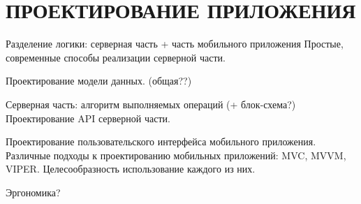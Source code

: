\section[Проектирование приложения]{%
  ПРОЕКТИРОВАНИЕ ПРИЛОЖЕНИЯ
}

\label{sec:design}

Разделение логики: серверная часть + часть мобильного приложения
Простые, современные способы реализации серверной части.

Проектирование модели данных. (общая??)

Серверная часть: алгоритм выполняемых операций (+ блок-схема?)
Проектирование API серверной части.

Проектирование пользовательского интерфейса мобильного приложения.
Различные подходы к проектированию мобильных приложений: MVC, MVVM, VIPER.
Целесообразность использование каждого из них.

Эргономика?
